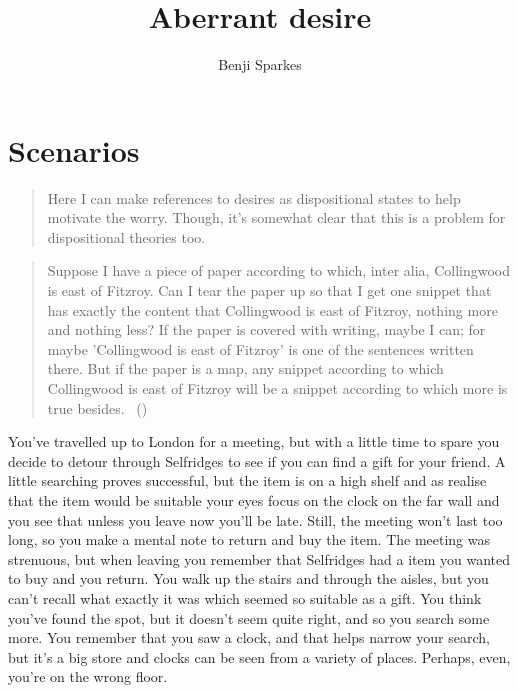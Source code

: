 \documentclass[10pt]{article}
\title{Aberrant desire}
\author{Benji Sparkes}
\begin{document}
\maketitle


\section{Scenarios}
\label{sec:scenarios}

\begin{quote}
  {\color{red} Here I can make references to desires as dispositional states to help motivate the worry.
  Though, it's somewhat clear that this is a problem for dispositional theories too.}
\end{quote}

\begin{quote}
  Suppose I have a piece of paper according to which, inter alia, Collingwood is east of Fitzroy.
  Can I tear the paper up so that I get one snippet that has exactly the content that Collingwood is east of Fitzroy, nothing more and nothing less?
  If the paper is covered with writing, maybe I can; for maybe 'Collingwood is east of Fitzroy' is one of the sentences written there.
  But if the paper is a map, any snippet according to which Collingwood is east of Fitzroy will be a snippet according to which more is true besides.\nolinebreak
  \mbox{ }(\citeyear[310]{Lewis:1999ab})
\end{quote}

\begin{scenario}\label{scn:gift}
  You've travelled up to London for a meeting, but with a little time to spare you decide to detour through Selfridges to see if you can find a gift for your friend.
  A little searching proves successful, but the item is on a high shelf and as realise that the item would be suitable your eyes focus on the clock on the far wall and you see that unless you leave now you'll be late.
  Still, the meeting won't last too long, so you make a mental note to return and buy the item.
  The meeting was strenuous, but when leaving you remember that Selfridges had a item you wanted to buy and you return.
  You walk up the stairs and through the aisles, but you can't recall what exactly it was which seemed so suitable as a gift.
  You think you've found the spot, but it doesn't seem quite right, and so you search some more.
  You remember that you saw a clock, and that helps narrow your search, but it's a big store and clocks can be seen from a variety of places.
  Perhaps, even, you're on the wrong floor.
\end{scenario}
\end{document}
